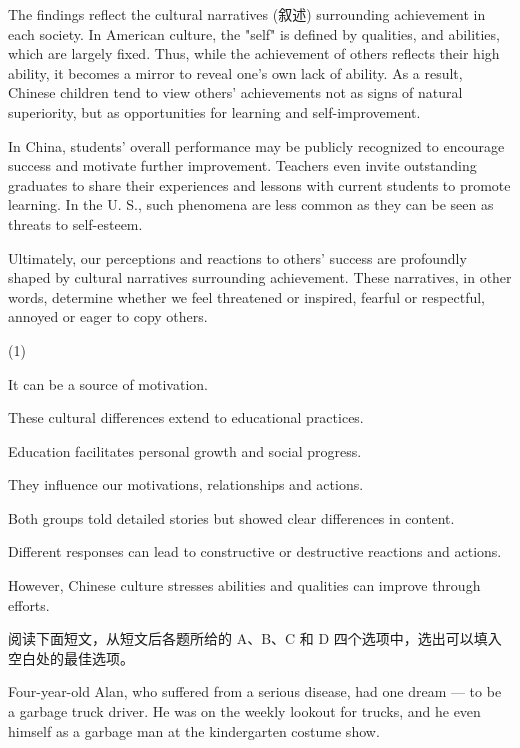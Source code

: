 \documentclass{英语试卷}
\begin{document}
\par The findings reflect the cultural narratives (叙述) surrounding achievement in each society. In American culture, the "self" is defined by qualities, and abilities, which are largely fixed. Thus, while the achievement of others reflects their high ability, it becomes a mirror to reveal one's own lack of ability.  As a result, Chinese children tend to view others' achievements not as signs of natural superiority, but as opportunities for learning and self-improvement.\par
\par {} In China, students' overall performance may be publicly recognized to encourage success and motivate further improvement. Teachers even invite outstanding graduates to share their experiences and lessons with current students to promote learning. In the U. S., such phenomena are less common as they can be seen as threats to self-esteem.\par
\par Ultimately, our perceptions and reactions to others' success are profoundly shaped by cultural narratives surrounding achievement.  These narratives, in other words, determine whether we feel threatened or inspired, fearful or respectful, annoyed or eager to copy others.\par
\begin{choices}(1)
  \item It can be a source of motivation.
  \item These cultural differences extend to educational practices.
  \item Education facilitates personal growth and social progress.
  \item They influence our motivations, relationships and actions.
  \item Both groups told detailed stories but showed clear differences in content.
  \item Different responses can lead to constructive or destructive reactions and actions.
  \item However, Chinese culture stresses abilities and qualities can improve through efforts.
\end{choices}
\par 阅读下面短文，从短文后各题所给的 A、B、C 和 D 四个选项中，选出可以填入空白处的最佳选项。\par
\par Four-year-old Alan, who suffered from a serious disease, had one dream — to be a garbage truck driver. He was on the weekly lookout for trucks, and he even  himself as a garbage man at the kindergarten costume show.\par
\end{document}
